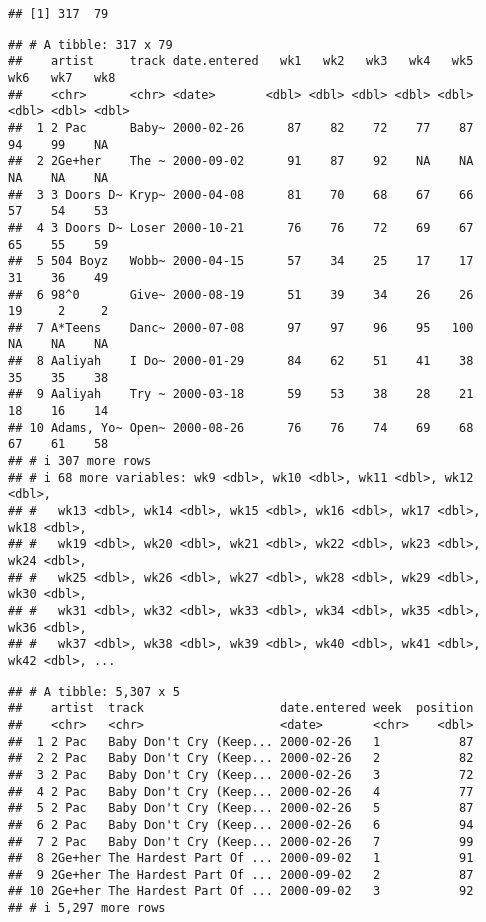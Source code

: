 \documentclass[
]{article}
\begin{document}
\begin{verbatim}
## [1] 317  79
\end{verbatim}

\begin{verbatim}
## # A tibble: 317 x 79
##    artist     track date.entered   wk1   wk2   wk3   wk4   wk5   wk6   wk7   wk8
##    <chr>      <chr> <date>       <dbl> <dbl> <dbl> <dbl> <dbl> <dbl> <dbl> <dbl>
##  1 2 Pac      Baby~ 2000-02-26      87    82    72    77    87    94    99    NA
##  2 2Ge+her    The ~ 2000-09-02      91    87    92    NA    NA    NA    NA    NA
##  3 3 Doors D~ Kryp~ 2000-04-08      81    70    68    67    66    57    54    53
##  4 3 Doors D~ Loser 2000-10-21      76    76    72    69    67    65    55    59
##  5 504 Boyz   Wobb~ 2000-04-15      57    34    25    17    17    31    36    49
##  6 98^0       Give~ 2000-08-19      51    39    34    26    26    19     2     2
##  7 A*Teens    Danc~ 2000-07-08      97    97    96    95   100    NA    NA    NA
##  8 Aaliyah    I Do~ 2000-01-29      84    62    51    41    38    35    35    38
##  9 Aaliyah    Try ~ 2000-03-18      59    53    38    28    21    18    16    14
## 10 Adams, Yo~ Open~ 2000-08-26      76    76    74    69    68    67    61    58
## # i 307 more rows
## # i 68 more variables: wk9 <dbl>, wk10 <dbl>, wk11 <dbl>, wk12 <dbl>,
## #   wk13 <dbl>, wk14 <dbl>, wk15 <dbl>, wk16 <dbl>, wk17 <dbl>, wk18 <dbl>,
## #   wk19 <dbl>, wk20 <dbl>, wk21 <dbl>, wk22 <dbl>, wk23 <dbl>, wk24 <dbl>,
## #   wk25 <dbl>, wk26 <dbl>, wk27 <dbl>, wk28 <dbl>, wk29 <dbl>, wk30 <dbl>,
## #   wk31 <dbl>, wk32 <dbl>, wk33 <dbl>, wk34 <dbl>, wk35 <dbl>, wk36 <dbl>,
## #   wk37 <dbl>, wk38 <dbl>, wk39 <dbl>, wk40 <dbl>, wk41 <dbl>, wk42 <dbl>, ...
\end{verbatim}

\begin{verbatim}
## # A tibble: 5,307 x 5
##    artist  track                   date.entered week  position
##    <chr>   <chr>                   <date>       <chr>    <dbl>
##  1 2 Pac   Baby Don't Cry (Keep... 2000-02-26   1           87
##  2 2 Pac   Baby Don't Cry (Keep... 2000-02-26   2           82
##  3 2 Pac   Baby Don't Cry (Keep... 2000-02-26   3           72
##  4 2 Pac   Baby Don't Cry (Keep... 2000-02-26   4           77
##  5 2 Pac   Baby Don't Cry (Keep... 2000-02-26   5           87
##  6 2 Pac   Baby Don't Cry (Keep... 2000-02-26   6           94
##  7 2 Pac   Baby Don't Cry (Keep... 2000-02-26   7           99
##  8 2Ge+her The Hardest Part Of ... 2000-09-02   1           91
##  9 2Ge+her The Hardest Part Of ... 2000-09-02   2           87
## 10 2Ge+her The Hardest Part Of ... 2000-09-02   3           92
## # i 5,297 more rows
\end{verbatim}
\end{document}

